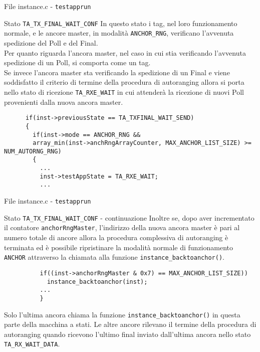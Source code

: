 \begin{frame}[fragile, shrink=30]{File instance.c - \lstinline!testapprun!}
  \begin{block}{Stato \lstinline!TA_TX_FINAL_WAIT_CONF!}
    In questo stato i tag, nel loro funzionamento normale, e le ancore master, in modalità
    \lstinline!ANCHOR_RNG!, verificano l'avvenuta spedizione del Poll e del Final.\\
    Per quanto riguarda l'ancora master, nel caso in cui stia verificando l'avvenuta spedizione
    di un Poll, si comporta come un tag.\\
    Se invece l'ancora master sta verificando la spedizione di un Final e viene soddisfatto il criterio
    di termine della procedura di autoranging allora si porta nello stato di ricezione
    \lstinline!TA_RXE_WAIT! in cui attenderà la ricezione di nuovi Poll provenienti dalla nuova ancora master.
    \begin{lstlisting}
      if(inst->previousState == TA_TXFINAL_WAIT_SEND)
      {
        if(inst->mode == ANCHOR_RNG && 
        array_min(inst->anchRngArrayCounter, MAX_ANCHOR_LIST_SIZE) >= NUM_AUTORNG_RNG)
        {
          ...
          inst->testAppState = TA_RXE_WAIT;
          ...
    \end{lstlisting}
  \end{block}
\end{frame}

\begin{frame}[fragile, shrink=30]{File instance.c - \lstinline!testapprun!}
  \begin{block}{Stato \lstinline!TA_TX_FINAL_WAIT_CONF! - continuazione}
    Inoltre se, dopo aver incrementato il contatore \lstinline!anchorRngMaster!,
    l'indirizzo della nuova ancora master è pari
    al numero totale di ancore allora la procedura \alert{complessiva} di autoranging
    è terminata ed è possibile ripristinare la modalità normale di funzionamento \lstinline!ANCHOR!
    attraverso la chiamata alla funzione \lstinline!instance_backtoanchor()!.
    \begin{lstlisting}
          if((inst->anchorRngMaster & 0x7) == MAX_ANCHOR_LIST_SIZE))
            instance_backtoanchor(inst);
          ...
          }
    \end{lstlisting}
    \alert{Solo l'ultima ancora} chiama la funzione \lstinline!instance_backtoanchor()!
    in questa parte della macchina a stati. Le altre ancore rilevano il termine della procedura
    di autoranging quando ricevono l'ultimo final inviato dall'ultima
    ancora nello stato \lstinline!TA_RX_WAIT_DATA!.
  \end{block}
\end{frame}

